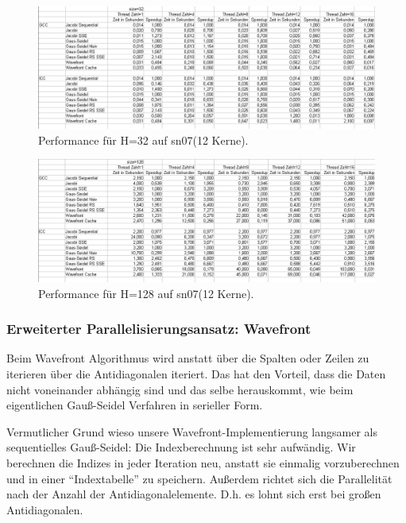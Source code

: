 \documentclass{article}
\begin{document}
\begin{figure}[htbp] 
  \centering
     \includegraphics[width=1.0\textwidth]{bilder/sn0732.png}
  \caption{Performance für H=32 auf sn07(12 Kerne).}
 
\end{figure}

\begin{figure}[htbp] 
  \centering
     \includegraphics[width=1.0\textwidth]{bilder/sn07128.png}
  \caption{Performance für H=128 auf sn07(12 Kerne).}
 
\end{figure}

\subsubsection{Erweiterter Parallelisierungsansatz: Wavefront}
Beim Wavefront Algorithmus wird anstatt über die Spalten oder Zeilen zu iterieren über die Antidiagonalen iteriert. Das hat den Vorteil, dass die Daten nicht voneinander abhängig sind und das selbe herauskommt, wie beim eigentlichen Gauß-Seidel Verfahren in serieller Form.

Vermutlicher Grund wieso unsere Wavefront-Implementierung langsamer als sequentielles Gauß-Seidel: Die Indexberechnung ist sehr aufwändig. Wir berechnen  die Indizes in jeder Iteration neu, anstatt sie einmalig vorzuberechnen und in einer ``Indextabelle'' zu speichern. Außerdem richtet sich die Parallelität nach der Anzahl der Antidiagonalelemente. D.h. es lohnt sich erst bei großen Antidiagonalen.
\end{document}
